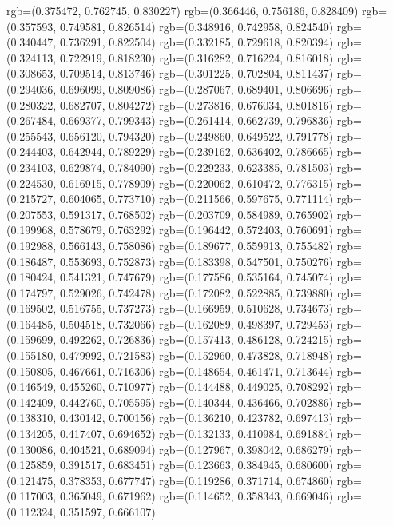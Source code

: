 {{{					rgb=(0.375472, 0.762745, 0.830227)
					rgb=(0.366446, 0.756186, 0.828409)
					rgb=(0.357593, 0.749581, 0.826514)
					rgb=(0.348916, 0.742958, 0.824540)
					rgb=(0.340447, 0.736291, 0.822504)
					rgb=(0.332185, 0.729618, 0.820394)
					rgb=(0.324113, 0.722919, 0.818230)
					rgb=(0.316282, 0.716224, 0.816018)
					rgb=(0.308653, 0.709514, 0.813746)
					rgb=(0.301225, 0.702804, 0.811437)
					rgb=(0.294036, 0.696099, 0.809086)
					rgb=(0.287067, 0.689401, 0.806696)
					rgb=(0.280322, 0.682707, 0.804272)
					rgb=(0.273816, 0.676034, 0.801816)
					rgb=(0.267484, 0.669377, 0.799343)
					rgb=(0.261414, 0.662739, 0.796836)
					rgb=(0.255543, 0.656120, 0.794320)
					rgb=(0.249860, 0.649522, 0.791778)
					rgb=(0.244403, 0.642944, 0.789229)
					rgb=(0.239162, 0.636402, 0.786665)
					rgb=(0.234103, 0.629874, 0.784090)
					rgb=(0.229233, 0.623385, 0.781503)
					rgb=(0.224530, 0.616915, 0.778909)
					rgb=(0.220062, 0.610472, 0.776315)
					rgb=(0.215727, 0.604065, 0.773710)
					rgb=(0.211566, 0.597675, 0.771114)
					rgb=(0.207553, 0.591317, 0.768502)
					rgb=(0.203709, 0.584989, 0.765902)
					rgb=(0.199968, 0.578679, 0.763292)
					rgb=(0.196442, 0.572403, 0.760691)
					rgb=(0.192988, 0.566143, 0.758086)
					rgb=(0.189677, 0.559913, 0.755482)
					rgb=(0.186487, 0.553693, 0.752873)
					rgb=(0.183398, 0.547501, 0.750276)
					rgb=(0.180424, 0.541321, 0.747679)
					rgb=(0.177586, 0.535164, 0.745074)
					rgb=(0.174797, 0.529026, 0.742478)
					rgb=(0.172082, 0.522885, 0.739880)
					rgb=(0.169502, 0.516755, 0.737273)
					rgb=(0.166959, 0.510628, 0.734673)
					rgb=(0.164485, 0.504518, 0.732066)
					rgb=(0.162089, 0.498397, 0.729453)
					rgb=(0.159699, 0.492262, 0.726836)
					rgb=(0.157413, 0.486128, 0.724215)
					rgb=(0.155180, 0.479992, 0.721583)
					rgb=(0.152960, 0.473828, 0.718948)
					rgb=(0.150805, 0.467661, 0.716306)
					rgb=(0.148654, 0.461471, 0.713644)
					rgb=(0.146549, 0.455260, 0.710977)
					rgb=(0.144488, 0.449025, 0.708292)
					rgb=(0.142409, 0.442760, 0.705595)
					rgb=(0.140344, 0.436466, 0.702886)
					rgb=(0.138310, 0.430142, 0.700156)
					rgb=(0.136210, 0.423782, 0.697413)
					rgb=(0.134205, 0.417407, 0.694652)
					rgb=(0.132133, 0.410984, 0.691884)
					rgb=(0.130086, 0.404521, 0.689094)
					rgb=(0.127967, 0.398042, 0.686279)
					rgb=(0.125859, 0.391517, 0.683451)
					rgb=(0.123663, 0.384945, 0.680600)
					rgb=(0.121475, 0.378353, 0.677747)
					rgb=(0.119286, 0.371714, 0.674860)
					rgb=(0.117003, 0.365049, 0.671962)
					rgb=(0.114652, 0.358343, 0.669046)
					rgb=(0.112324, 0.351597, 0.666107)
}}}
